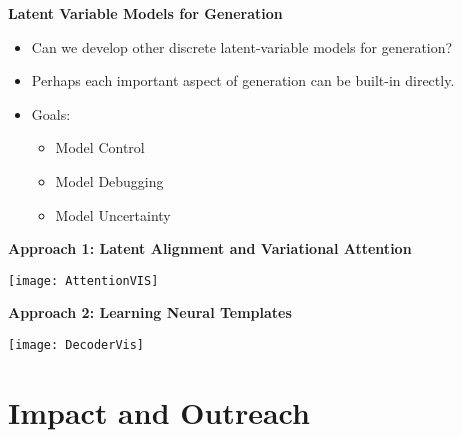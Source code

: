 \begin{frame}
  \begin{center}
    \textbf{ Latent Variable Models for Generation}
  \end{center}
  
  \begin{itemize}
  \item Can we develop other discrete latent-variable models for generation?
    \air
  \item Perhaps each important aspect of generation can be built-in directly.
    \air
  \item Goals:
    \begin{itemize}
    \item Model Control 
    \item Model Debugging
    \item Model Uncertainty
    \end{itemize}
  \end{itemize}
\end{frame}



\begin{frame}
  \begin{center}
    \textbf{Approach 1: Latent Alignment and Variational Attention}
  \end{center}
  
  \begin{center}
    \texttt{[image: AttentionVIS]}
  \end{center}
\end{frame}


\begin{frame}
  \begin{center}
    \textbf{Approach 2: Learning Neural Templates}
  \end{center}

  \begin{center}
    \texttt{[image: DecoderVis]}
  \end{center}
\end{frame}


\begin{frame}{}

\end{frame}

\begin{frame}

\end{frame}

\section{Impact and Outreach}

